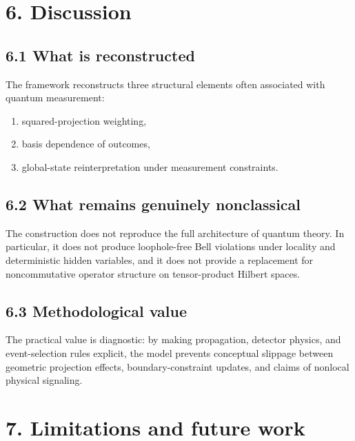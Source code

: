 \documentclass[
  letterpaper,
  DIV=11,
  numbers=noendperiod]{scrartcl}
\providecommand{\tightlist}{%
  \setlength{\itemsep}{0pt}\setlength{\parskip}{0pt}}
\begin{document}
\section{6. Discussion}\label{discussion}

\subsection{6.1 What is reconstructed}\label{what-is-reconstructed}

The framework reconstructs three structural elements often associated
with quantum measurement:

\begin{enumerate}
\def\labelenumi{\arabic{enumi}.}
\tightlist
\item
  squared-projection weighting,
\item
  basis dependence of outcomes,
\item
  global-state reinterpretation under measurement constraints.
\end{enumerate}

\subsection{6.2 What remains genuinely
nonclassical}\label{what-remains-genuinely-nonclassical}

The construction does not reproduce the full architecture of quantum
theory. In particular, it does not produce loophole-free Bell violations
under locality and deterministic hidden variables, and it does not
provide a replacement for noncommutative operator structure on
tensor-product Hilbert spaces.

\subsection{6.3 Methodological value}\label{methodological-value}

The practical value is diagnostic: by making propagation, detector
physics, and event-selection rules explicit, the model prevents
conceptual slippage between geometric projection effects,
boundary-constraint updates, and claims of nonlocal physical signaling.

\section{7. Limitations and future
work}\label{limitations-and-future-work}
\end{document}
